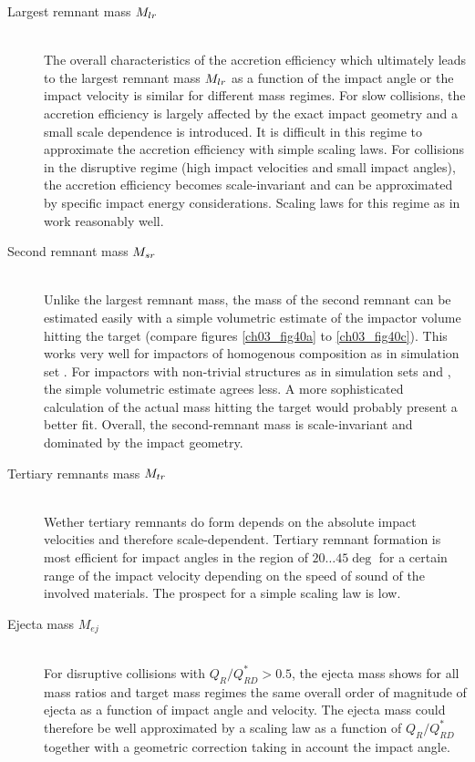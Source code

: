 \begin{description}
\item[Largest remnant mass $M_{lr}$] \hfill \\ 
The overall characteristics of the accretion efficiency which ultimately leads to the largest remnant mass $M_{lr}$ as a function of the impact angle or the impact velocity is similar for different mass regimes. For slow collisions, the accretion efficiency is largely affected by the exact impact geometry and a small scale dependence is introduced. It is difficult in this regime to approximate the accretion efficiency with simple scaling laws. For collisions in the disruptive regime (high impact velocities and small impact angles), the accretion efficiency becomes scale-invariant and can be approximated by specific impact energy considerations. Scaling laws for this regime as in \cite{Stewart:2009p3265, 2009ApJ...700L.118M, 2010ApJ...712L..73M, Leinhardt:2011p4060} work reasonably well.
\item[Second remnant mass $M_{sr}$] \hfill \\ 
Unlike the largest remnant mass, the mass of the second remnant can be estimated easily with a simple volumetric estimate of the impactor volume hitting the target (compare figures \ref{ch03_fig40a} to \ref{ch03_fig40c}). This works very well for impactors of homogenous composition as in simulation set \rss. For impactors with non-trivial structures as in simulation sets \css and \iss, the simple volumetric estimate agrees less. A more sophisticated calculation of the actual mass hitting the target would probably present a better fit. Overall, the second-remnant mass is scale-invariant and dominated by the impact geometry.
\item[Tertiary remnants mass $M_{tr}$] \hfill \\
Wether tertiary remnants do form depends on the absolute impact velocities and therefore scale-dependent. Tertiary remnant formation is most efficient for impact angles in the region of $20 \dots 45 \deg$ for a certain range of the impact velocity depending on the speed of sound of the involved materials. The prospect for a simple scaling law is low.
\item[Ejecta mass $M_{ej}$] \hfill \\ 
For disruptive collisions with $Q_{R} / Q_{RD}^* > 0.5$, the ejecta mass shows for all mass ratios and target mass regimes the same overall order of magnitude of ejecta as a function of impact angle and velocity. The ejecta mass could therefore be well approximated by a scaling law as a function of $Q_{R} / Q_{RD}^*$ together with a geometric correction taking in account the impact angle.

\end{description}
